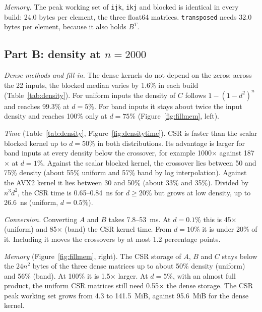 \documentclass[11pt,a4paper]{article}
\begin{document}
\textit{Memory.} The peak working set of \texttt{ijk}, \texttt{ikj} and blocked is identical
in every build: 24.0 bytes per element, the three float64 matrices. \texttt{transposed}
needs 32.0 bytes per element, because it also holds $B^T$.

\subsection{Part B: density at $n = 2000$}

\textit{Dense methods and fill-in.} The dense kernels do not depend on the zeros: across the
22 inputs, the blocked median varies by 1.6\% in each build (Table~\ref{tab:density}). For
uniform inputs the density of $C$ follows $1 - (1 - d^2)^n$ and reaches 99.3\% at $d = 5\%$.
For band inputs it stays about twice the input density and reaches 100\% only at $d = 75\%$
(Figure~\ref{fig:fillmem}, left).

\textit{Time} (Table~\ref{tab:density}, Figure~\ref{fig:densitytime}). CSR is faster than
the scalar blocked kernel up to $d = 50\%$ in both distributions. Its advantage is larger for
band inputs at every density below the crossover, for example 1000$\times$ against
187$\times$ at $d = 1\%$. Against the scalar blocked kernel, the crossover lies between 50
and 75\% density (about 55\% uniform and 57\% band by log interpolation). Against the AVX2
kernel it lies between 30 and 50\% (about 33\% and 35\%). Divided by $n^3 d^2$, the CSR time
is 0.65--0.84~ns for $d \ge 20\%$ but grows at low density, up to 26.6~ns (uniform,
$d = 0.5\%$).

\textit{Conversion.} Converting $A$ and $B$ takes 7.8--53~ms. At $d = 0.1\%$ this is
45$\times$ (uniform) and 85$\times$ (band) the CSR kernel time. From $d = 10\%$ it is under
20\% of it. Including it moves the crossovers by at most 1.2 percentage points.

\textit{Memory} (Figure~\ref{fig:fillmem}, right). The CSR storage of $A$, $B$ and $C$ stays
below the $24n^2$ bytes of the three dense matrices up to about 50\% density (uniform) and
56\% (band). At 100\% it is 1.5$\times$ larger. At $d = 5\%$, with an almost full product,
the uniform CSR matrices still need 0.55$\times$ the dense storage. The CSR peak working set
grows from 4.3 to 141.5~MiB, against 95.6~MiB for the dense kernel.
\end{document}
